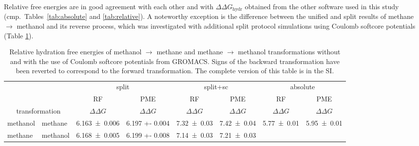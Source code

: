 \documentclass[journal=jctcce,manuscript=article]{achemso}
\begin{document}
Relative free energies are in good agreement with each other and with 
$\Delta \Delta G_{\mathrm{hydr}}$ obtained from the other software used in this 
study (cmp.\ Tables~\ref{tab:absolute} and \ref{tab:relative}).  A noteworthy 
exception is the difference between the unified and split results of methane 
$\rightarrow$ methanol and its reverse process, which was investigated with 
additional split protocol simulations using Coulomb softcore potentials (Table 
\ref{tab:eff-sc}).

\begin{table}[]
\centering
\caption{Relative hydration free energies of methanol $\rightarrow$ methane and 
methane $\rightarrow$ methanol transformations without and with the use of 
Coulomb softcore potentials from GROMACS. Signs of the backward 
transformation have been reverted to correspond to the forward transformation. 
The complete version of this table is in the SI.}
\label{tab:eff-sc}
\begin{tabular}{@{}llclclcl@{}}
\toprule
 &  & \multicolumn{2}{c}{split} & \multicolumn{2}{c}{split+sc} & 
 \multicolumn{2}{c}{absolute} \\
 &  & RF & \multicolumn{1}{c}{PME} & RF & \multicolumn{1}{c}{PME} & RF & 
 \multicolumn{1}{c}{PME} \\
\multicolumn{2}{c}{transformation} & $\Delta \Delta G$ & 
\multicolumn{1}{c}{$\Delta \Delta G$} & $\Delta \Delta G$ & 
\multicolumn{1}{c}{$\Delta \Delta G$} & $\Delta \Delta G$ & 
\multicolumn{1}{c}{$\Delta \Delta G$} \\ \midrule
methanol & methane & \multicolumn{1}{l}{\num{6.163 +- 0.006}} & \num{6.197 +- 
0.004} & \multicolumn{1}{l}{\num{7.32+-0.03}} & \num{7.42+-0.04} &
\multicolumn{1}{l}{\num{5.77 +- 0.01}} & \num{5.95 +- 0.01} \\
methane & methanol & \multicolumn{1}{l}{\num{6.168 +- 0.005}} & \num{6.199 +- 
0.008} & \multicolumn{1}{l}{\num{7.14+-0.03}} & \num{7.21+-0.03} & 
\multicolumn{1}{l}{} &  \\ \bottomrule
\end{tabular}
\end{table}
\end{document}
